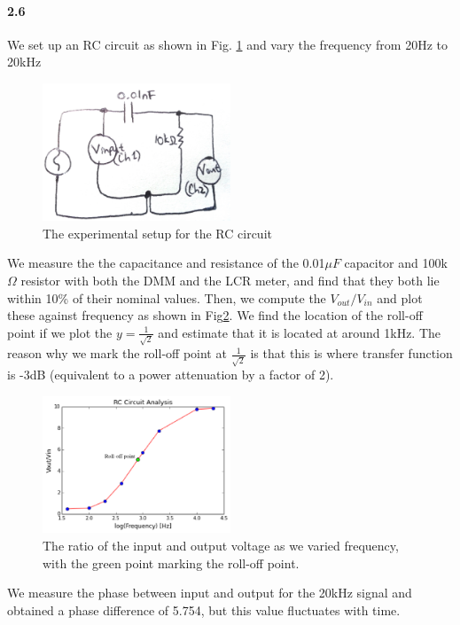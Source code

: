 \documentclass[authoryear, 12pt,5p, times]{elsarticle}
\begin{document}
\paragraph{\textbf{2.6}}
We set up an RC circuit as shown in Fig. \ref{rc_setup} and vary the frequency from 20Hz to 20kHz
\begin{figure}[h!]
\includegraphics[width=0.5\textwidth]{figure/rc_setup}
\caption{The experimental setup for the RC circuit}
\label{rc_setup}
\end{figure}
We measure the the capacitance and resistance of the 0.01\(\mu F\) capacitor and 100k\(\Omega\) resistor with both the DMM and the LCR meter, and find that they both lie within 10\% of their nominal values. Then, we compute the \(V_{out}/V_{in}\) and plot these against frequency as shown in Fig\ref{rc_circuit}.  We find the location of the roll-off point if we plot the \(y = \frac{1}{\sqrt{2}}\) and estimate that it is located at around 1kHz. The reason why we mark the roll-off point at \(\frac{1}{\sqrt{2}} \) is that this is where transfer function is -3dB (equivalent to a power attenuation by a factor of 2). 
 \begin{figure}[h!]
\includegraphics[width=0.5\textwidth]{figure/rc_circuit}
\caption{The ratio of the input and output voltage as we varied frequency, with the green point marking the roll-off point.}
\label{rc_circuit}
\end{figure}
\par We measure the phase between input and output for the 20kHz signal and obtained a phase difference of 5.754\degree, but this value fluctuates with time.
\end{document}
